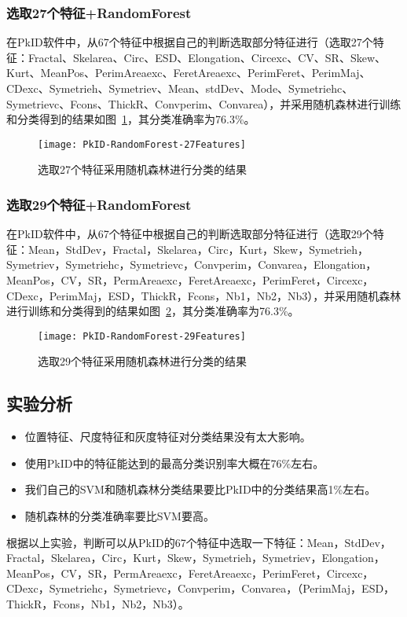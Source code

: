 \subsubsection{选取27个特征+RandomForest}
在PkID软件中，从67个特征中根据自己的判断选取部分特征进行（选取27个特征：Fractal、Skelarea、Circ、ESD、Elongation、Circexc、CV、SR、Skew、Kurt、MeanPos、PerimAreaexc、FeretAreaexc、PerimFeret、PerimMaj、CDexc、Symetrieh、Symetriev、Mean、stdDev、Mode、Symetriehc、Symetrievc、Fcons、ThickR、Convperim、Convarea），并采用随机森林进行训练和分类得到的结果如图~\ref{fig:PkID-RandomForest-27Features}，其分类准确率为76.3\%。

\begin{figure}[!ht]
\centering
\texttt{[image: PkID-RandomForest-27Features]}
\caption{选取27个特征采用随机森林进行分类的结果}
\label{fig:PkID-RandomForest-27Features}
\end{figure}

\subsubsection{选取29个特征+RandomForest}
在PkID软件中，从67个特征中根据自己的判断选取部分特征进行（选取29个特征：Mean，StdDev，Fractal，Skelarea，Circ，Kurt，Skew，Symetrieh，Symetriev，Symetriehc，Symetrievc，Convperim，Convarea，Elongation，MeanPos，CV，SR，PermAreaexc，FeretAreaexc，PerimFeret，Circexc，CDexc，PerimMaj，ESD，ThickR，Fcons，Nb1，Nb2，Nb3），并采用随机森林进行训练和分类得到的结果如图~\ref{fig:PkID-RandomForest-29Features}，其分类准确率为76.3\%。

\begin{figure}[!ht]
\centering
\texttt{[image: PkID-RandomForest-29Features]}
\caption{选取29个特征采用随机森林进行分类的结果}
\label{fig:PkID-RandomForest-29Features}
\end{figure}

\subsection{实验分析}
\begin{itemize}
\item 位置特征、尺度特征和灰度特征对分类结果没有太大影响。
\item 使用PkID中的特征能达到的最高分类识别率大概在76\%左右。
\item 我们自己的SVM和随机森林分类结果要比PkID中的分类结果高1\%左右。
\item 随机森林的分类准确率要比SVM要高。
\end{itemize}
根据以上实验，判断可以从PkID的67个特征中选取一下特征：Mean，StdDev，Fractal，Skelarea，Circ，Kurt，Skew，Symetrieh，Symetriev，Elongation，MeanPos，CV，SR，PermAreaexc，FeretAreaexc，PerimFeret，Circexc，CDexc，{\color{blue}Symetriehc，Symetrievc，Convperim，Convarea}，（PerimMaj，ESD，{\color{blue}ThickR，Fcons，Nb1，Nb2，Nb3}）。

